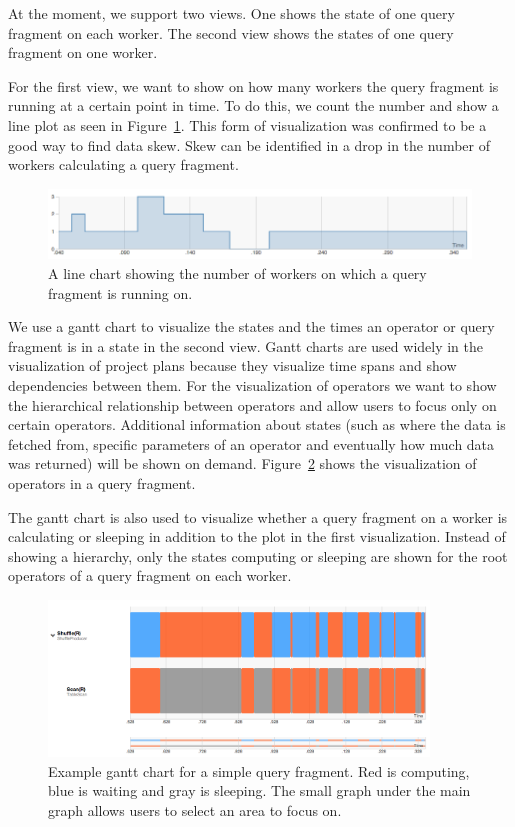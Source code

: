 \documentclass[11pt]{scrartcl}
\begin{document}
At the moment, we support two views. One shows the state of one query fragment on each worker. The second view shows the states of one query fragment on one worker.

For the first view, we want to show on how many workers the query fragment is running at a certain point in time. To do this, we count the number and show a line plot as seen in Figure~\ref{fig:line}. This form of visualization was confirmed to be a good way to find data skew. Skew can be identified in a drop in the number of workers calculating a query fragment.

\begin{figure}[h]
  \begin{center}
    \includegraphics[width=1\textwidth]{line.png}
  \end{center}
  \caption{A line chart showing the number of workers on which a query fragment is running on.}
  \label{fig:line}
\end{figure}

We use a gantt chart to visualize the states and the times an operator or query fragment is in a state in the second view. Gantt charts are used widely in the visualization of project plans because they visualize time spans and show dependencies between them. For the visualization of operators we want to show the hierarchical relationship between operators and allow users to focus only on certain operators. Additional information about states (such as where the data is fetched from, specific parameters of an operator and eventually how much data was returned) will be shown on demand. Figure~\ref{fig:gantt} shows the visualization of operators in a query fragment.

The gantt chart is also used to visualize whether a query fragment on a worker is calculating or sleeping in addition to the plot in the first visualization. Instead of showing a hierarchy, only the states computing or sleeping are shown for the root operators of a query fragment on each worker.

\begin{figure}[h]
  \begin{center}
    \includegraphics[width=0.9\textwidth]{realgantt}
  \end{center}
  \caption{Example gantt chart for a simple query fragment. Red is computing, blue is waiting and gray is sleeping. The small graph under the main graph allows users to select an area to focus on.}
  \label{fig:gantt}
\end{figure}
\end{document}
